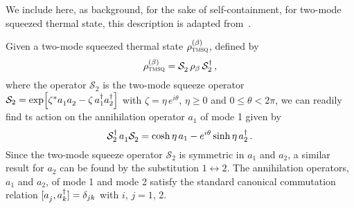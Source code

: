 \documentclass[11pt,a4paper]{article}
\begin{document}
We include here, as background, for the sake of self-containment,  for two-mode squeezed thermal state, this description is adapted from~\cite{HAH22}.

Given a two-mode squeezed thermal state $\rho_{\textsc{tmsq}}^{(\beta)}$, defined by
\begin{equation}
	\rho_{\textsc{tmsq}}^{(\beta)}=\mathcal{S}_{2}^{\vphantom{\dagger}}\,\rho_{\beta}\,\mathcal{S}_{2}^{\dagger}\,,
\end{equation}
where the operator $\mathcal{S}_{2}$ is the two-mode squeeze operator $\mathcal{S}_{2}=\exp\Bigl[\zeta^{*}a_{1}^{\vphantom{\dagger}}a_{2}^{\vphantom{\dagger}}-\zeta\,a_{1}^{\dagger}a_{2}^{\dagger}\Bigr]$ with $\zeta=\eta\,e^{i\theta}$, $\eta\geq0$ and $0\leq\theta<2\pi$, we can readily find ts action on the annihilation operator $a_1$ of mode 1 given by
\begin{equation}
	\mathcal{S}_{2}^{\dagger}\,a_{1}^{\vphantom{\dagger}}\mathcal{S}_{2}^{\vphantom{\dagger}}=\cosh\eta\,a_{1}-e^{i\theta}\sinh\eta\,a_{2}^{\dagger}\,.
\end{equation}
Since the two-mode squeeze operator $\mathcal{S}_{2}$ is symmetric in $a_{1}$ and $a_{2}$, a similar result for $a_{2}$ can be found by the substitution $1\leftrightarrow2$. The annihilation operators, $a_1$ and $a_2$, of mode 1 and mode 2 satisfy the standard canonical commutation relation $[a_j^{\vphantom{\dagger}},a_k^{\dagger}]=\delta_{jk}$ with $i$, $j=1$, 2.
\end{document}
